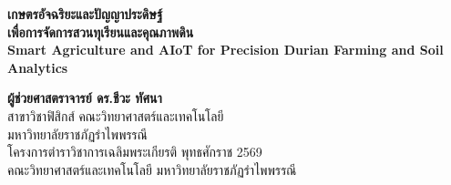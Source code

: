 \begin{titlepage}
\begin{center}
    \vspace*{1.5cm}
    
    {\Huge\bfseries\color{agriForest} เกษตรอัจฉริยะและปัญญาประดิษฐ์}\\[0.5cm]
    {\LARGE\bfseries\color{durianGold} เพื่อการจัดการสวนทุเรียนและคุณภาพดิน}\\[0.6cm]
    {\large\sffamily\bfseries\color{aiotCyan} Smart Agriculture and AIoT for Precision Durian Farming and Soil Analytics}\\[2.0cm]
    
    \begin{figure}[H]
    \centering
    \end{figure}
    
    \vspace{2.0cm}
    
    {\Large\bfseries\color{agriForest} ผู้ช่วยศาสตราจารย์ ดร.ชีวะ ทัศนา}\\[0.3cm]
    {\normalsize สาขาวิชาฟิสิกส์ คณะวิทยาศาสตร์และเทคโนโลยี}\\[0.2cm]
    {\normalsize มหาวิทยาลัยราชภัฏรำไพพรรณี}\\[2.0cm]
    
    {\normalsize โครงการตำราวิชาการเฉลิมพระเกียรติ พุทธศักราช 2569}\\[0.2cm]
    {\small คณะวิทยาศาสตร์และเทคโนโลยี มหาวิทยาลัยราชภัฏรำไพพรรณี}
\end{center}
\end{titlepage}
